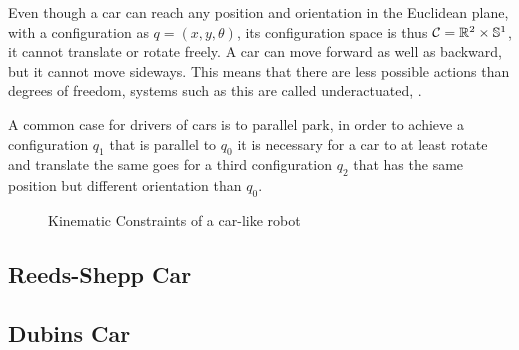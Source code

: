 Even though a car can reach any position and orientation in the Euclidean plane, with a configuration as $q = (x,y,\theta)$, its configuration space is thus $\mathcal{C} = \mathbb{R}^2 \times \mathbb{S}^1$, it cannot translate or rotate freely. A car can move forward as well as backward, but it cannot move sideways. This means that there are less possible actions than degrees of freedom, systems such as this are called underactuated, \cite{LaValle.2006}.

A common case for drivers of cars is to parallel park, in order to achieve a configuration $q_1$ that is parallel to $q_0$ it is necessary for a car to at least rotate and translate the same goes for a third configuration $q_2$ that has the same position but different orientation than $q_0$. \cite{Latombe.1991}

\begin{figure}[h]
    \caption{Kinematic Constraints of a car-like robot}
    \label{fig:kinematicConstraints}
\end{figure}

\subsection{Reeds-Shepp Car}

\subsection{Dubins Car}